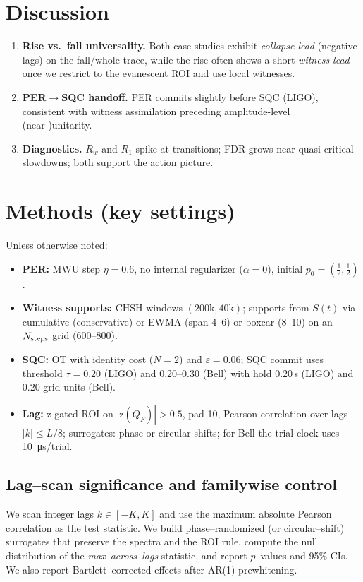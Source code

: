 \documentclass[11pt]{article}
\begin{document}
\section{Discussion}
\begin{enumerate}[leftmargin=1.2em]
\item \textbf{Rise vs.\ fall universality.} Both case studies exhibit \emph{collapse-lead} (negative lags) on the fall/whole trace, while the rise often shows a short \emph{witness-lead} once we restrict to the evanescent ROI and use local witnesses.
\item \textbf{PER$\to$SQC handoff.} PER commits slightly before SQC (LIGO), consistent with witness assimilation preceding amplitude-level (near-)unitarity.
\item \textbf{Diagnostics.} $R_w$ and $R_1$ spike at transitions; FDR grows near quasi-critical slowdowns; both support the action picture.
\end{enumerate}

\section{Methods (key settings)}
Unless otherwise noted:
\begin{itemize}[leftmargin=1.2em]
\item \textbf{PER:} MWU step $\eta\!=\!0.6$, no internal regularizer ($\alpha\!=\!0$), initial $p_0=(\tfrac12,\tfrac12)$.
\item \textbf{Witness supports:} CHSH windows $(200\mathrm{k},40\mathrm{k})$; supports from $S(t)$ via cumulative (conservative) or EWMA (span 4--6) or boxcar (8--10) on an $N_{\rm steps}$ grid (600--800).
\item \textbf{SQC:} OT with identity cost ($N\!=\!2$) and $\varepsilon\!=\!0.06$; SQC commit uses threshold $\tau\!=\!0.20$ (LIGO) and $0.20$--$0.30$ (Bell) with hold $0.20$\,s (LIGO) and $0.20$ grid units (Bell).
\item \textbf{Lag:} z-gated ROI on $|\mathrm{z}(\dot Q_F)|>\!0.5$, pad 10, Pearson correlation over lags $|k|\le L/8$; surrogates: phase or circular shifts; for Bell the trial clock uses \SI{10}{\micro s}/trial.
\end{itemize}

\subsection*{Lag–scan significance and familywise control}
We scan integer lags $k\in[-K,K]$ and use the maximum absolute Pearson correlation as the test statistic.
We build phase–randomized (or circular–shift) surrogates that preserve the spectra and the ROI rule, compute the null distribution of the \emph{max–across–lags} statistic, and report $p$–values and 95\% CIs.
We also report Bartlett–corrected effects after AR(1) prewhitening.
\end{document}
